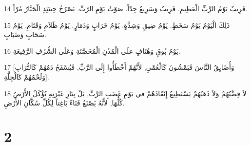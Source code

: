 \par 14 قَرِيبٌ يَوْمُ الرَّبِّ الْعَظِيمِ. قَرِيبٌ وَسَرِيعٌ جِدّاً. صَوْتُ يَوْمِ الرّبِّ. يَصْرُخُ حِينَئِذٍ الْجَبَّارُ مُرّاً.
\par 15 ذَلِكَ الْيَوْمُ يَوْمُ سَخَطٍ. يَوْمُ ضِيقٍ وَشِدَّةٍ. يَوْمُ خَرَابٍ وَدَمَارٍ. يَوْمُ ظَلاَمٍ وَقَتَامٍ. يَوْمُ سَحَابٍ وَضَبَابٍ.
\par 16 يَوْمُ بُوقٍ وَهُتَافٍ علَى الْمُدُنِ الْمُحَصَّنَةِ وَعَلَى الشُّرُفِ الرَّفِيعَةِ.
\par 17 [وَأُضَايِقُ النَّاسَ فَيَمْشُونَ كَالْعُمْيِ, لأَنَّهُمْ أَخْطَأُوا إِلَى الرَّبِّ, فَيُسْفَحُ دَمُهُمْ كَالتُّرَابِ وَلَحْمُهُمْ كَالْجِلَّةِ].
\par 18 لاَ فِضَّتُهُمْ وَلاَ ذَهَبُهُمْ يَسْتَطِيعُ إِنْقَاذَهُمْ في يَوْمِ غَضَبِ الرَّبِّ, بَلْ بِنَارِ غَيْرَتِهِ تُؤْكَلُ الأَرْضُ كُلُّهَا, لأَنَّهُ يَصْنَعُ فَنَاءً بَاغِتاً لِكُلِّ سُكَّانِ الأَرْضِ.

\chapter{2}

